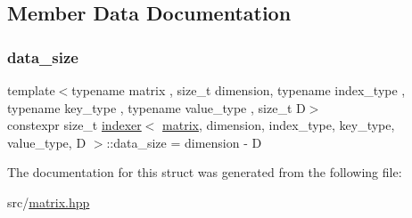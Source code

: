 \subsection{Member Data Documentation}
\mbox{\label{structindexer_a895fa35da574edcb525dcb7705f771b2}} 
\subsubsection{\texorpdfstring{data\+\_\+size}{data\_size}}
{\footnotesize\ttfamily template$<$typename matrix , size\+\_\+t dimension, typename index\+\_\+type , typename key\+\_\+type , typename value\+\_\+type , size\+\_\+t D$>$ \\
constexpr size\+\_\+t \hyperlink{structindexer}{indexer}$<$ \hyperlink{structmatrix}{matrix}, dimension, index\+\_\+type, key\+\_\+type, value\+\_\+type, D $>$\+::data\+\_\+size = dimension -\/ D\hspace{0.3cm}{\ttfamily [static]}}



The documentation for this struct was generated from the following file\+:\begin{DoxyCompactItemize}
\item 
src/\hyperlink{matrix_8hpp}{matrix.\+hpp}\end{DoxyCompactItemize}
